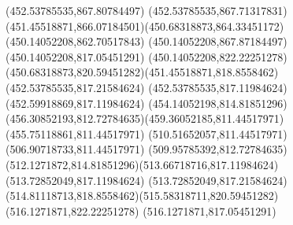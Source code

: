{{	\lineto(452.53785535,867.80784497)
	\lineto(452.53785535,867.71317831)
	\curveto(451.45518871,866.07184501)(450.68318873,864.33451172)(450.14052208,862.70517843)
	\lineto(450.14052208,867.87184497)
	\closepath
	\moveto(450.14052208,817.05451291)
	\lineto(450.14052208,822.22251278)
	\curveto(450.68318873,820.59451282)(451.45518871,818.8558462)(452.53785535,817.21584624)
	\lineto(452.53785535,817.11984624)
	\lineto(452.59918869,817.11984624)
	\curveto(454.14052198,814.81851296)(456.30852193,812.72784635)(459.36052185,811.44517971)
	\lineto(455.75118861,811.44517971)
	\closepath
	\moveto(510.51652057,811.44517971)
	\lineto(506.90718733,811.44517971)
	\curveto(509.95785392,812.72784635)(512.1271872,814.81851296)(513.66718716,817.11984624)
	\lineto(513.72852049,817.11984624)
	\lineto(513.72852049,817.21584624)
	\curveto(514.81118713,818.8558462)(515.58318711,820.59451282)(516.1271871,822.22251278)
	\lineto(516.1271871,817.05451291)
	\closepath
}
}
\providecommand{\MKQLiftY}[1]{#1}
\providecommand{\MKQShiftVitals}[1]{#1}
\ifdefined\MKQCompactVitals

\else
{
}
